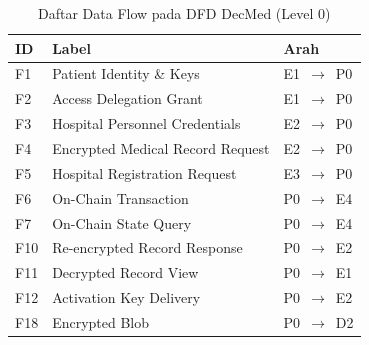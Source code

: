 \begin{table}[H]
	\centering
	\caption{Daftar Data Flow pada DFD DecMed (Level 0)}
	\label{tab:dfd-dataflow-level-0}
	\small
	\begin{tabular}{|p{}|p{}|p{}|}
		\hline
		\textbf{ID} & \textbf{Label}                   & \textbf{Arah}       \\ \hline
		F1          & Patient Identity \& Keys         & E1~$\rightarrow$~P0 \\ \hline
		F2          & Access Delegation Grant          & E1~$\rightarrow$~P0 \\ \hline
		F3          & Hospital Personnel Credentials   & E2~$\rightarrow$~P0 \\ \hline
		F4          & Encrypted Medical Record Request & E2~$\rightarrow$~P0 \\ \hline
		F5          & Hospital Registration Request    & E3~$\rightarrow$~P0 \\ \hline
		F6          & On-Chain Transaction             & P0~$\rightarrow$~E4 \\ \hline
		F7          & On-Chain State Query             & P0~$\rightarrow$~E4 \\ \hline
		F10         & Re-encrypted Record Response     & P0~$\rightarrow$~E2 \\ \hline
		F11         & Decrypted Record View            & P0~$\rightarrow$~E1 \\ \hline
		F12         & Activation Key Delivery          & P0~$\rightarrow$~E2 \\ \hline
		F18         & Encrypted Blob                   & P0~$\rightarrow$~D2 \\ \hline
	\end{tabular}
\end{table}

